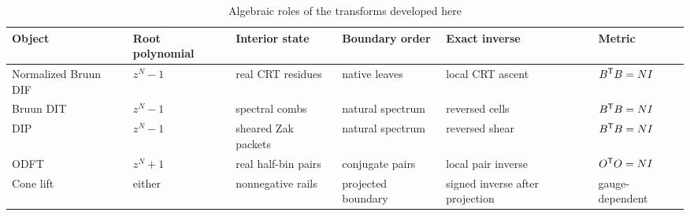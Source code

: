 \begin{table}[t]
\caption{Algebraic roles of the transforms developed here}
\label{tab:relation}
\centering
\scriptsize
\begin{tabularx}{\textwidth}{@{}lXXXXX@{}}
\toprule
Object & Root polynomial & Interior state & Boundary order & Exact inverse & Metric\\
\midrule
Normalized Bruun DIF & $z^N-1$ & real CRT residues & native leaves & local CRT ascent & $B^{\mathsf{T}}B=NI$\\
Bruun DIT & $z^N-1$ & spectral combs & natural spectrum & reversed cells & $B^{\mathsf{T}}B=NI$\\
DIP & $z^N-1$ & sheared Zak packets & natural spectrum & reversed shear & $B^{\mathsf{T}}B=NI$\\
ODFT & $z^N+1$ & real half-bin pairs & conjugate pairs & local pair inverse & $O^{\mathsf{T}}O=NI$\\
Cone lift & either & nonnegative rails & projected boundary & signed inverse after projection & gauge-dependent\\
\bottomrule
\end{tabularx}
\end{table}
